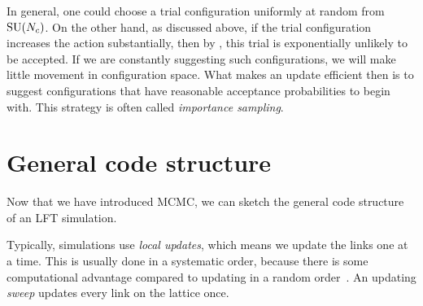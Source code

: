 In general, one could choose a trial configuration uniformly at random
from $\operatorname{SU}(N_c)$. On the other hand, as discussed above, if the trial
configuration increases the action substantially, then by
, this trial is exponentially unlikely to
be accepted. If we are constantly suggesting such configurations,
we will make little movement in configuration space.
What makes an update efficient then is to suggest configurations that
have reasonable acceptance probabilities to begin with. This
strategy is often called {\it importance sampling}.


\section{General code structure}

Now that we have introduced MCMC, we can sketch the
general code structure of an LFT simulation. 

Typically, simulations use {\it local updates}, which
means we update the links one at a time. This is usually done in a systematic order,
because there is some computational advantage compared to updating in a
random order~\cite{berg_markov_2004}. 
An updating {\it sweep} updates every link on the lattice once. 

